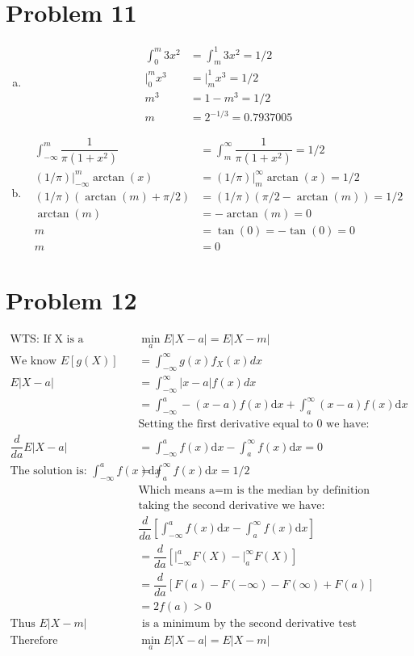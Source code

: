 \documentclass{article}
\newcommand{\dx}{\mathrm{d}x}
\begin{document}
\begin{flushleft}
\section{Problem 11}
\begin{enumerate}[(a)]
\item
\begin{align*}
\int_{0}^{m}3x^2&=\int_{m}^{1}3x^2=1/2\\
\bigg |_{0}^m x^3&=\bigg |_{m}^1 x^3=1/2\\
m^3&=1-m^3=1/2\\
m&=2^{-1/3}=0.7937005
\end{align*}
\item 
\begin{align*}
\int_{-\infty}^{m}\dfrac{1}{\pi(1+x^2)}&=\int_{m}^{\infty}\dfrac{1}{\pi(1+x^2)}=1/2\\
(1/\pi)\bigg |_{-\infty}^{m}\arctan(x)&= (1/\pi)\bigg|_{m}^{\infty}\arctan(x)=1/2\\
(1/\pi) (\arctan(m)+\pi/2)&=(1/\pi)(\pi/2-\arctan(m))=1/2\\
\arctan(m)&=-\arctan(m)=0\\
m&=\tan(0)=-\tan(0)=0\\
m&=0
\end{align*}
\end{enumerate}
\section*{Problem 12}
\begin{align*}
\text{WTS: If X is a continuous random variable: }&  \min_{a}E|X-a|=E|X-m|\\
\text{We know } E[g(X)]&=\int_{-\infty}^{\infty}g(x)f_X(x)dx\\
E|X-a|&=\int_{-\infty}^{\infty}|x-a|f(x)dx\\
&=\int_{-\infty}^{a}-(x-a)f(x)\dx +\int_{a}^{\infty}(x-a)f(x)\dx\\
&\text{Setting the first derivative equal to 0 we have:}\\
\dfrac{d}{da}E|X-a|&=\int_{-\infty}^{a}f(x)\dx-\int_{a}^{\infty}f(x)\dx=0\\
\text{The solution is: } \int_{-\infty}^{a}f(x)\dx&=\int_{a}^{\infty}f(x)\dx=1/2\\
&\text{Which means a=m is the median by definition}\\
&\text{taking the second derivative we have: }\\
&\dfrac{d}{da}\left[\int_{-\infty}^{a}f(x)\dx-\int_{a}^{\infty}f(x)\dx\right]\\
&=\dfrac{d}{da}\left[\bigg|_{-\infty}^{a}F(X)-\bigg|_{a}^{\infty}F(X)\right]\\
&=\dfrac{d}{da}\left[F(a)-F(-\infty)-F(\infty)+F(a)\right]\\
&=2f(a)>0\\
\text{Thus } E|X-m|& \text{ is a minimum by the second derivative test}\\
\text{Therefore } &\min_{a}E|X-a|=E|X-m|
\end{align*}

\end{flushleft}
\end{document}
